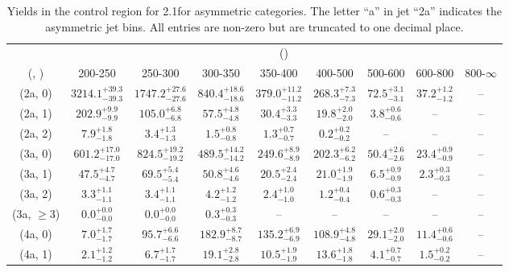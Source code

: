 \begin{table}[h!]
\tiny
\centering
\caption{Yields in the \mj control region for 2.1\ifb for asymmetric categories. The letter ``a'' in jet \eg ``2a''  indicates the asymmetric jet bins. All entries are non-zero but are truncated to one decimal place.\label{tab:yieldssep_mu_wjetstolnuht_asym}}
\begin{tabular}
{ccccccccc}
	\hline\hline
	& \multicolumn{8}{c}{\scalht (\gev)} \\ 
	 (\njet,  \nb) & 200-250 & 250-300 & 300-350 & 350-400 & 400-500 & 500-600 & 600-800 & 800-$\infty$ \\ [0.8ex] 
\hline
	(2a, 0) & $3214.1^{+ 39.3 }_{- 39.3 }$ & $1747.2^{+ 27.6 }_{- 27.6 }$ & $840.4^{+ 18.6 }_{- 18.6 }$ & $379.0^{+ 11.2 }_{- 11.2 }$ & $268.3^{+ 7.3 }_{- 7.3 }$ & $72.5^{+ 3.1 }_{- 3.1 }$ & $37.2^{+ 1.2 }_{- 1.2 }$ & -- \\[0.5ex] 
	(2a, 1) & $202.9^{+ 9.9 }_{- 9.9 }$ & $105.0^{+ 6.8 }_{- 6.8 }$ & $57.5^{+ 4.8 }_{- 4.8 }$ & $30.4^{+ 3.3 }_{- 3.3 }$ & $19.8^{+ 2.0 }_{- 2.0 }$ & $3.8^{+ 0.6 }_{- 0.6 }$ & -- & -- \\[0.5ex] 
	(2a, 2) & $7.9^{+ 1.8 }_{- 1.8 }$ & $3.4^{+ 1.3 }_{- 1.3 }$ & $1.5^{+ 0.8 }_{- 0.8 }$ & $1.3^{+ 0.7 }_{- 0.7 }$ & $0.2^{+ 0.2 }_{- 0.2 }$ & -- & -- & -- \\[0.5ex] 
	(3a, 0) & $601.2^{+ 17.0 }_{- 17.0 }$ & $824.5^{+ 19.2 }_{- 19.2 }$ & $489.5^{+ 14.2 }_{- 14.2 }$ & $249.6^{+ 8.9 }_{- 8.9 }$ & $202.3^{+ 6.2 }_{- 6.2 }$ & $50.4^{+ 2.6 }_{- 2.6 }$ & $23.4^{+ 0.9 }_{- 0.9 }$ & -- \\[0.5ex] 
	(3a, 1) & $47.5^{+ 4.7 }_{- 4.7 }$ & $69.5^{+ 5.4 }_{- 5.4 }$ & $50.8^{+ 4.6 }_{- 4.6 }$ & $20.5^{+ 2.4 }_{- 2.4 }$ & $21.0^{+ 1.9 }_{- 1.9 }$ & $6.5^{+ 0.9 }_{- 0.9 }$ & $2.3^{+ 0.3 }_{- 0.3 }$ & -- \\[0.5ex] 
	(3a, 2) & $3.3^{+ 1.1 }_{- 1.1 }$ & $3.4^{+ 1.1 }_{- 1.1 }$ & $4.2^{+ 1.2 }_{- 1.2 }$ & $2.4^{+ 1.0 }_{- 1.0 }$ & $1.2^{+ 0.4 }_{- 0.4 }$ & $0.6^{+ 0.3 }_{- 0.3 }$ & -- & -- \\[0.5ex] 
	(3a, $\ge3$) & $0.0^{+ 0.0 }_{- 0.0 }$ & $0.0^{+ 0.0 }_{- 0.0 }$ & $0.3^{+ 0.3 }_{- 0.3 }$ & -- & -- & -- & -- & -- \\[0.5ex] 
	(4a, 0) & $7.0^{+ 1.7 }_{- 1.7 }$ & $95.7^{+ 6.6 }_{- 6.6 }$ & $182.9^{+ 8.7 }_{- 8.7 }$ & $135.2^{+ 6.9 }_{- 6.9 }$ & $108.9^{+ 4.8 }_{- 4.8 }$ & $29.1^{+ 2.0 }_{- 2.0 }$ & $11.4^{+ 0.6 }_{- 0.6 }$ & -- \\[0.5ex] 
	(4a, 1) & $2.1^{+ 1.2 }_{- 1.2 }$ & $6.7^{+ 1.7 }_{- 1.7 }$ & $19.1^{+ 2.8 }_{- 2.8 }$ & $10.5^{+ 1.9 }_{- 1.9 }$ & $13.6^{+ 1.8 }_{- 1.8 }$ & $4.1^{+ 0.7 }_{- 0.7 }$ & $1.5^{+ 0.2 }_{- 0.2 }$ & -- \\[0.5ex] 

\end{tabular}
\end{table}
